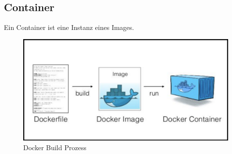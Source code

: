 \subsection{Container}
Ein Container ist eine Instanz eines Images.

\begin{figure}[H]
  \centering
  \includegraphics[scale=0.35]{images/docker.PNG}
  \caption{Docker Build Prozess}
  \label{performance}
\end{figure}

